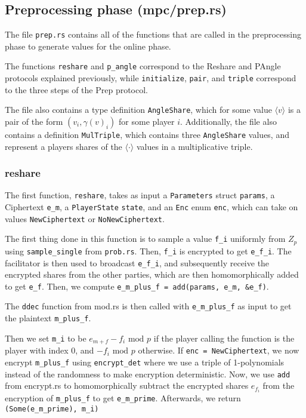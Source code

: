 \documentclass[../main.tex]{subfiles}
\begin{document}
\subsection{Preprocessing phase (mpc/prep.rs)}
The file \lstinline{prep.rs} contains all of the functions that are called in the preprocessing phase to generate values for the online phase.

The functions \lstinline{reshare} and \lstinline{p_angle} correspond to the Reshare and PAngle protocols explained previously, while \lstinline{initialize}, \lstinline{pair}, and \lstinline{triple} correspond to the three steps of the Prep protocol.

The file also contains a type definition \lstinline{AngleShare}, which for some value $\langle v \rangle$ is a pair of the form $(v_i, \gamma(v)_i)$ for some player $i$. Additionally, the file also contains a definition \lstinline{MulTriple}, which contains three \lstinline{AngleShare} values, and represent a players shares of the $\langle \cdot \rangle$ values in a multiplicative triple. %

\subsubsection{reshare}
The first function, \lstinline{reshare}, takes as input a \lstinline{Parameters} struct \lstinline{params}, a Ciphertext \lstinline{e_m}, a  \lstinline{PlayerState} \lstinline{state}, and an \lstinline{Enc} enum \lstinline{enc}, which can take on values \lstinline{NewCiphertext} or \lstinline{NoNewCiphertext}.

The first thing done in this function is to sample a value \lstinline{f_i} uniformly from $Z_p$ using \lstinline{sample_single} from \lstinline{prob.rs}. Then, \lstinline{f_i} is encrypted to get \lstinline{e_f_i}.
The facilitator is then used to broadcast \lstinline{e_f_i}, and subsequently receive the encrypted shares from the other parties, which are then homomorphically added to get \lstinline{e_f}. Then, we compute \lstinline{e_m_plus_f = add(params, e_m, &e_f)}.

The \lstinline{ddec} function from mod.rs is then called with \lstinline{e_m_plus_f} as input to get the plaintext \lstinline{m_plus_f}.

Then we set \lstinline{m_i} to be $e_{m + f} - f_i \text{ mod } p$ if the player calling the function is the player with index $0$, and $- f_i \text{ mod } p$ otherwise. If \lstinline{enc = NewCiphertext}, we now encrypt \lstinline{m_plus_f} using \lstinline{encrypt_det} where we use a triple of 1-polynomials instead of the randomness to make encryption deterministic. Now, we use \lstinline{add} from encrypt.rs to homomorphically subtract the encrypted shares $e_{f_i}$ from the encryption of \lstinline{m_plus_f} to get \lstinline{e_m_prime}. Afterwards, we return \lstinline{(Some(e_m_prime), m_i)}
\end{document}
